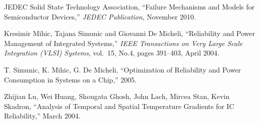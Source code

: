 \begin{thebibliography}{99}
    JEDEC Solid State Technology Association,
    ``Failure Mechanisms and Models for Semiconductor Devices,''
    \emph{JEDEC Publication},
    November 2010.

  Kresimir Mihic, Tajana Simunic and Giovanni De Micheli,
  ``Reliability and Power Management of Integrated Systems,''
  \emph{IEEE Transactions on Very Large Scale Integration (VLSI) Systems},
  vol.~15, No.4, pages 391--403, April 2004.

  T. Simunic, K. Mihic, G. De Micheli,
  ``Optimization of Reliability and Power Consumption in Systems on a Chip,''
  2005.

  Zhijian Lu, Wei Huang, Shougata Ghosh, John Lach, Mircea Stan, Kevin Skadron,
  ``Analysis of Temporal and Spatial Temperature Gradients for IC Reliability,''
  March 2004.

\end{thebibliography}
